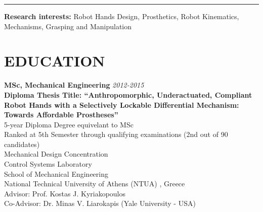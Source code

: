\documentclass[11pt]{res} %
\begin{document}
\begin{resume}
\noindent\rule{16.6cm}{0.4pt}



\vspace{8pt} %

\textbf{Research interests:} Robot Hands Design, Prosthetics, Robot Kinematics, Mechanisms, Grasping and Manipulation\\ 



\section{EDUCATION} 

\vspace{8pt} %

\small\textbf{MSc, Mechanical Engineering} \hfill {\sl 2012-2015}\\
\small\textbf{Diploma Thesis Title: ``Anthropomorphic, Underactuated, Compliant Robot Hands with a Selectively Lockable Differential Mechanism: Towards Affordable Prostheses''}\\
5-year Diploma Degree equivelant to MSc\\ Ranked at 5th Semester through qualifying examinations (2nd out of 90 candidates)\\%
Mechanical Design Concentration\\%
Control Systems Laboratory
\\%
School of Mechanical Engineering%
\\
National Technical University of Athens (NTUA)%
, Greece\\Advisor: %
Prof. Kostas J. Kyriakopoulos%
\\Co-Advisor: %
Dr. Minas V. Liarokapis (Yale University - USA)
 

\end{resume}
\end{document}
